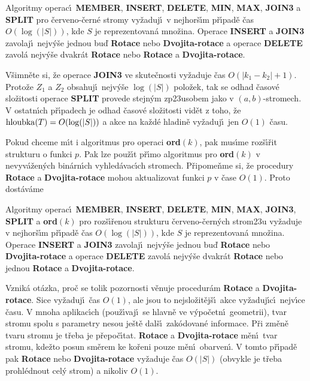 Algoritmy operac\'\i\ {\bf MEMBER}, {\bf INSERT}, 
{\bf DE\-LE\-TE}, {\bf MIN}, {\bf MAX}, {\bf JOIN3} a {\bf SPLIT} pro \v cerveno-\v cern\'e 
stro\-my vy\v zaduj\'\i\ v nejhor\v s\'\i m p\v r\'\i pad\v e \v cas $O
(\log(|S|))$, kde $S$ je 
reprezentovan\'a mno\v zina.  Operace {\bf INSERT} a {\bf JOIN3} zavolaj\'\i\ 
nejv\'y\v se jednou bu\v d {\bf Rotace} nebo {\bf Dvojita-rota\-ce} a operace 
{\bf DE\-LE\-TE} zavol\'a nejv\'y\v se dvakr\'at {\bf Rotace} nebo {\bf Rotace} a 
{\bf Dvojita-ro\-ta\-ce}.  
\endproclaim

\flushpar V\v simn\v ete si, \v ze operace {\bf JOIN3} ve skute\v cnosti 
vy\v zaduje \v cas $O(|k_1-k_2|+1)$. Proto\v ze $Z_1$ a $Z_2$ obsahuj\'\i\ nejv\'y\v se 
$\log(|S|)$ polo\v zek, tak se odhad \v casov\'e slo\v zitosti operace {\bf SPLIT }
prove\-de stejn\'ym zp\accent23usobem jako v $(a,b)$-stromech. 
V ostatn\'\i ch p\v r\'\i\-pa\-dech je odhad \v casov\'e slo\v zitosti vid\v et z toho, 
\v ze $\operatorname{hloubka}(T)=O(\log(|S|))$ a akce na ka\v zd\'e hladin\v e vy\v zaduj\'\i\ jen 
$O(1)$ \v casu.
\medskip

\flushpar Pokud chceme m\'\i t i algoritmus pro operaci {\bf ord$
(k)$}, pak 
mus\'\i me roz\v s\'\i\v rit strukturu o funkci $p$. Pak lze pou\v z\'\i t p\v r\'\i mo 
algoritmus pro {\bf ord$(k)$} v nevyv\'a\v zen\'ych bin\'arn\'\i ch vyhled\'avac\'\i ch 
stromech. P\v ripome\v nme si, \v ze procedury {\bf Rotace} a {\bf Dvojita-rotace }
mohou aktualizovat funkci $p$ v \v case $O(1)$. Proto dost\'av\'ame 

Algoritmy operac\'\i\ {\bf MEMBER}, 
{\bf INSERT}, {\bf DE\-LE\-TE}, {\bf MIN}, {\bf MAX}, {\bf JOIN3}, {\bf SPLIT} a {\bf ord$
(k)$} pro 
roz\-\v s\'\i\-\v re\-nou strukturu \v cerveno-\v cern\'ych strom\accent23u vy\v zaduje 
v nejhor\v s\'\i m p\v r\'\i pad\v e \v cas $O(\log(|S|))$, kde $S$ je reprezentovan\'a 
mno\v zina.  Operace {\bf INSERT} a {\bf JOIN3} zavolaj\'\i\ nejv\'y\v se jednou bu\v d 
{\bf Rotace} nebo {\bf Dvojita-rota\-ce} a operace {\bf DELETE} zavol\'a nejv\'y\v se 
dvakr\'at {\bf Rotace} nebo jednou {\bf Rotace} a {\bf Dvojita-rotace}.  \endproclaim


\flushpar Vznik\'a ot\'azka, pro\v c se tolik pozornosti v\v enuje 
procedur\'am {\bf Rotace} a {\bf Dvojita-rotace}. Sice vy\v zaduj\'\i\ \v cas 
$O(1)$, ale jsou to nej\-slo\v zit\v ej\v s\'\i\ akce vy\v zaduj\'\i c\'\i\ nejv\'\i ce \v casu. 
V mnoha aplikac\'\i ch (pou\-\v z\'\i vaj\'\i\ se hlavn\v e ve v\'ypo\v cetn\'\i\ geometrii), 
tvar stromu spolu s parametry nesou je\v st\v e 
dal\v s\'\i\ zak\'odovan\'e informace. P\v ri zm\v en\v e tvaru stromu je 
t\v reba je p\v repo\v c\'\i tat. {\bf Rotace} a {\bf Dvojita-rotace} m\v en\'\i\ tvar 
stromu, kde\v zto posun sm\v erem ke ko\v reni pouze m\v en\'\i\ 
obarven\'\i . V tomto p\v r\'\i pad\v e pak {\bf Rotace} nebo {\bf Dvo\-ji\-ta-rotace }
vy\v zaduje \v cas $O(|S|)$ (obvykle je t\v reba prohl\'ednout cel\'y 
strom) a nikoliv $O(1)$.
\medskip

